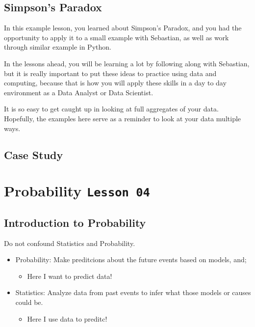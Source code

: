\documentclass[]{book}
\providecommand{\tightlist}{%
  \setlength{\itemsep}{0pt}\setlength{\parskip}{0pt}}
\begin{document}
\subsection{Simpson's Paradox}\label{simpsons-paradox}

In this example lesson, you learned about Simpson's Paradox, and you had
the opportunity to apply it to a small example with Sebastian, as well
as work through similar example in Python.

In the lessons ahead, you will be learning a lot by following along with
Sebastian, but it is really important to put these ideas to practice
using data and computing, because that is how you will apply these
skills in a day to day environment as a Data Analyst or Data Scientist.

It is so easy to get caught up in looking at full aggregates of your
data. Hopefully, the examples here serve as a reminder to look at your
data multiple ways.

\subsection{Case Study}\label{case-study}

\section{\texorpdfstring{Probability
\texttt{Lesson\ 04}}{Probability Lesson 04}}\label{probability-lesson-04}

\subsection{Introduction to
Probability}\label{introduction-to-probability}

Do not confound Statistics and Probability.

\begin{itemize}
\tightlist
\item
  Probability: Make preditcions about the future events based on models,
  and;

  \begin{itemize}
  \tightlist
  \item
    Here I want to predict data!
  \end{itemize}
\item
  Statistics: Analyze data from past events to infer what those models
  or causes could be.

  \begin{itemize}
  \tightlist
  \item
    Here I use data to preditc!
  \end{itemize}
\end{itemize}
\end{document}
